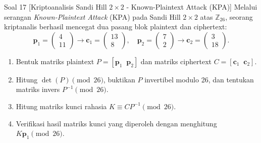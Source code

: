 \documentclass[11pt,a4paper]{article}
\begin{document}
\begin{soalanalisis}{Soal 17 [Kriptoanalisis Sandi Hill $2 \times 2$ - Known-Plaintext Attack (KPA)]}
Melalui serangan \textit{Known-Plaintext Attack} (KPA) pada Sandi Hill $2 \times 2$ atas $\mathbb{Z}_{26}$, seorang kriptanalis berhasil mencegat dua pasang blok plaintext dan ciphertext:
\[
\mathbf{p}_1 = \begin{pmatrix} 4 \\ 11 \end{pmatrix} \to \mathbf{c}_1 = \begin{pmatrix} 13 \\ 8 \end{pmatrix}, \quad \mathbf{p}_2 = \begin{pmatrix} 7 \\ 2 \end{pmatrix} \to \mathbf{c}_2 = \begin{pmatrix} 3 \\ 18 \end{pmatrix}.
\]
\begin{enumerate}[label=(\alph*)]
    \item Bentuk matriks plaintext $P = [\mathbf{p}_1 \;\; \mathbf{p}_2]$ dan matriks ciphertext $C = [\mathbf{c}_1 \;\; \mathbf{c}_2]$.
    \item Hitung $\det(P) \pmod{26}$, buktikan $P$ invertibel modulo 26, dan tentukan matriks invers $P^{-1} \pmod{26}$.
    \item Hitung matriks kunci rahasia $K \equiv C P^{-1} \pmod{26}$.
    \item Verifikasi hasil matriks kunci yang diperoleh dengan menghitung $K \mathbf{p}_1 \pmod{26}$.
\end{enumerate}
\end{soalanalisis}
\end{document}
